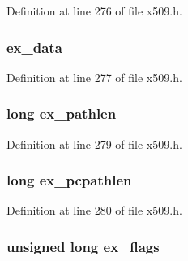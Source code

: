 Definition at line 276 of file x509.\+h.

\subsubsection[{\texorpdfstring{ex\+\_\+data}{ex_data}}]{ ex\+\_\+data}\hypertarget{structx509__st_ac3e4fd59d6ee44a81f3a58114613c1e2}{}\label{structx509__st_ac3e4fd59d6ee44a81f3a58114613c1e2}


Definition at line 277 of file x509.\+h.

\subsubsection[{\texorpdfstring{ex\+\_\+pathlen}{ex_pathlen}}]{\setlength{\rightskip}{0pt plus 5cm}long ex\+\_\+pathlen}\hypertarget{structx509__st_a4b0b3ef6b67555028523786658c85002}{}\label{structx509__st_a4b0b3ef6b67555028523786658c85002}


Definition at line 279 of file x509.\+h.

\subsubsection[{\texorpdfstring{ex\+\_\+pcpathlen}{ex_pcpathlen}}]{\setlength{\rightskip}{0pt plus 5cm}long ex\+\_\+pcpathlen}\hypertarget{structx509__st_ad0930d0756ed4e567cb07cd21938a5be}{}\label{structx509__st_ad0930d0756ed4e567cb07cd21938a5be}


Definition at line 280 of file x509.\+h.

\subsubsection[{\texorpdfstring{ex\+\_\+flags}{ex_flags}}]{\setlength{\rightskip}{0pt plus 5cm}unsigned long ex\+\_\+flags}\hypertarget{structx509__st_affd7c15a4eeebd4b67eb29baa4dce58a}{}\label{structx509__st_affd7c15a4eeebd4b67eb29baa4dce58a}


